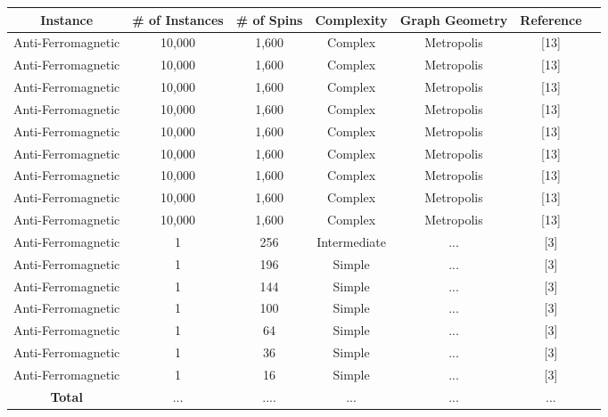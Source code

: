 \documentclass{standalone}
\begin{document}
\begin{tabular}{ |c|c|c|c|c|c|c| } 
    \hline
    \textbf{Instance} & \textbf{\# of Instances} & \textbf{\# of Spins} & \textbf{Complexity} & \textbf{Graph Geometry} & \textbf{Reference}\\ 
    \hline
    Anti-Ferromagnetic & 10,000 & 1,600 & Complex & Metropolis & [13] \\
    Anti-Ferromagnetic & 10,000 & 1,600 & Complex & Metropolis & [13] \\
    Anti-Ferromagnetic & 10,000 & 1,600 & Complex & Metropolis & [13] \\
    Anti-Ferromagnetic & 10,000 & 1,600 & Complex & Metropolis & [13] \\
    Anti-Ferromagnetic & 10,000 & 1,600 & Complex & Metropolis & [13] \\
    Anti-Ferromagnetic & 10,000 & 1,600 & Complex & Metropolis & [13] \\
    Anti-Ferromagnetic & 10,000 & 1,600 & Complex & Metropolis & [13] \\
    Anti-Ferromagnetic & 10,000 & 1,600 & Complex & Metropolis & [13] \\
    Anti-Ferromagnetic & 10,000 & 1,600 & Complex & Metropolis & [13] \\
    Anti-Ferromagnetic & 1 & 256 & Intermediate & ... & [3] \\
    Anti-Ferromagnetic & 1 & 196 & Simple & ... & [3] \\
    Anti-Ferromagnetic & 1 & 144 & Simple & ... & [3] \\
    Anti-Ferromagnetic & 1 & 100 & Simple & ... & [3] \\
    Anti-Ferromagnetic & 1 & 64 & Simple & ... & [3] \\
    Anti-Ferromagnetic & 1 & 36 & Simple & ... & [3] \\
    Anti-Ferromagnetic & 1 & 16 & Simple & ... & [3] \\
    \hline
    \textbf{Total} & ... & .... & ... & ... & ... \\
    \hline
\end{tabular}
\end{document}
